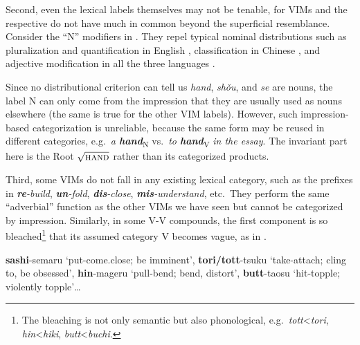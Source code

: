 \documentclass[output=paper]{langsci/langscibook}
\begin{document}
Second, even the lexical labels themselves may not be tenable, for \glspl{VIM}
and the respective  do not have much in common beyond the
superficial resemblance. Consider the ``N'' modifiers in . They
repel typical nominal distributions such as pluralization and quantification in
English , classification in Chinese , and adjective
modification in all the three languages .

\ea\label{ex:n}
\label{ex:n-eng}
\label{ex:n-chi}
\label{ex:n-all}
\z
\z

\noindent Since no distributional criterion can tell us \textit{hand},
\textit{sh\v{o}u}, and \textit{se} are nouns, the label N can only come from
the impression that they are usually used as nouns elsewhere (the same is true
for the other \gls{VIM} labels). However, such impression-based categorization
is unreliable, because the same form may be reused in different categories,
e.g.\ \textit{a \textbf{hand}}\textsubscript{N} vs.\ \textit{to
\textbf{hand}}\textsubscript{V} \textit{in the essay}. The invariant part here
is the Root $\sqrt{\textrm{\textsc{hand}}}$ rather than its categorized
products.


Third, some \glspl{VIM} do not fall in any existing lexical category, such as the prefixes in \textit{\textbf{re}-build},
\textit{\textbf{un}-fold}, \textit{\textbf{dis}-close},
\textit{\textbf{mis}-understand}, etc.\ They perform the same ``adverbial''
function as the other \glspl{VIM} we have seen but cannot be categorized by
impression. Similarly, in some  V-V compounds, the first
component is so bleached\footnote{The bleaching is not only semantic but also
phonological, e.g.\ \textit{tott}<\textit{tori}, \textit{hin}<\textit{hiki},
\textit{butt}<\textit{buchi}.} that its assumed category V becomes vague, as in
.

\ea\label{ex:jap-pre}
\textbf{sashi}-semaru {`put-come.close; be imminent'}, \textbf{tori/tott}-tsuku {`take-attach; cling to, be obsessed'}, \textbf{hin}-mageru {`pull-bend; bend, distort'}, \textbf{butt}-taosu {`hit-topple; violently topple'}\dots
\z
\end{document}
